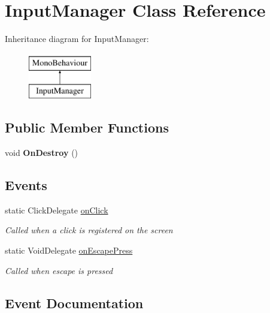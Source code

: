 \hypertarget{class_input_manager}{}\section{Input\+Manager Class Reference}
\label{class_input_manager}
Inheritance diagram for Input\+Manager\+:\begin{figure}[H]
\begin{center}
\leavevmode
\includegraphics[height=2.000000cm]{class_input_manager}
\end{center}
\end{figure}
\subsection*{Public Member Functions}
\begin{DoxyCompactItemize}
\item 
void {\bfseries On\+Destroy} ()\hypertarget{class_input_manager_ae45098c58b84ad9d805c20cceee492d0}{}\label{class_input_manager_ae45098c58b84ad9d805c20cceee492d0}

\end{DoxyCompactItemize}
\subsection*{Events}
\begin{DoxyCompactItemize}
\item 
static Click\+Delegate \hyperlink{class_input_manager_a1cc95536c19ed45ce645e20aca69755e}{on\+Click}
\begin{DoxyCompactList}\small\item\em Called when a click is registered on the screen \end{DoxyCompactList}\item 
static Void\+Delegate \hyperlink{class_input_manager_a81a585645cea9e8936c148e0b653df36}{on\+Escape\+Press}
\begin{DoxyCompactList}\small\item\em Called when escape is pressed \end{DoxyCompactList}\end{DoxyCompactItemize}


\subsection{Event Documentation}
